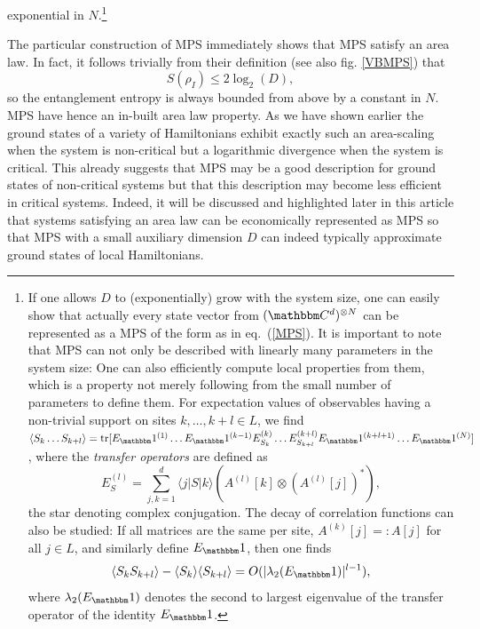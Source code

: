 \documentclass[12pt, rmp,floatfix,epsfig,graphics]{revtex4} %
\begin{document}
exponential in $N$.\footnote{If one allows $D$ to 
(exponentially) grow with the system size, one can easily show 
that actually every state vector from $(\cc^{d})^{\otimes N}$ 
can be represented as a MPS of the form as in eq.\ (\ref{MPS}). 
It is important to note that MPS can not only be described with 
linearly many parameters in the system size: One can also 
efficiently compute local properties from them, which is a property 
not merely following from the small number of parameters 
to define them. For expectation values of
 observables having a non-trivial support on sites $k,\dots, k+l\in L$,
 we find
 $ \langle S_k \dots S_{k+l}\rangle = \text{tr}[E_\id^{(1)}\dots E_\id^{(k-1)}
         E_{S_{k}}^{(k)}\dots E_{S_{k+l}}^{(k+l)} E_\id^{(k+l+1)}\dots E_\id^{(N)}]$,
 where the {\it transfer operators} are defined as
 \begin{equation*}
         E_S^{(l)}= \sum_{j,k=1}^d \langle j|S|k\rangle 
         \left( A^{(l)}[k]\otimes  (A^{(l)}[j])^\ast \right),
 \end{equation*}
 the star denoting complex conjugation.
The decay of correlation functions can also be studied:
If all matrices are the same per site, $A^{(k)}[j]=:A[j]$
 for all $j\in L$, and similarly define
 $E_\id$, then one finds
 \begin{equation*}
 	\langle S_k S_{k+l}\rangle - \langle S_k \rangle  \langle S_{k+l}\rangle  =
         O(  |\lambda_2(E_\id) |^{l-1}),
  \end{equation*}        
where $\lambda_2(E_\id)$ denotes the second to largest eigenvalue of
 the transfer operator of the identity $E_\id$.
}

The particular construction of MPS immediately shows
that MPS satisfy an area law. In fact, it follows trivially 
from their definition (see also fig. \ref{VBMPS}) that
\begin{equation*}
        S(\rho_I) \leq 2 \log_2 (D), 
\end{equation*}
so the entanglement entropy is always bounded from above by 
a constant in $N$. MPS have hence an in-built area law property. 
As we have shown earlier the ground states of a variety of 
Hamiltonians exhibit exactly such an area-scaling when the 
system is non-critical but a logarithmic divergence when the
system is critical. This already suggests that MPS may be
a good description for ground states of non-critical systems but
that this description may become less efficient in critical systems.
Indeed, it will be discussed and highlighted later in this
article that systems satisfying an area law can be economically 
represented as MPS so that MPS with a small auxiliary 
dimension $D$ can indeed typically approximate 
ground states of local Hamiltonians. 
\end{document}
